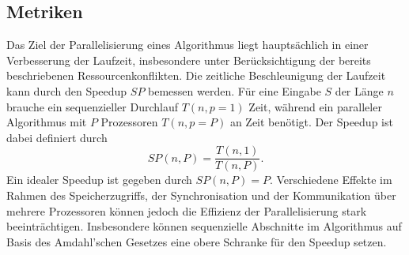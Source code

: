 \subsection{Metriken}
Das Ziel der Parallelisierung eines Algorithmus liegt hauptsächlich in einer Verbesserung der Laufzeit, insbesondere unter Berücksichtigung der bereits beschriebenen Ressourcenkonflikten. 
Die zeitliche Beschleunigung der Laufzeit kann durch den Speedup $SP$ bemessen werden. Für eine Eingabe $S$ der Länge $n$ brauche ein sequenzieller Durchlauf $T(n, p=1)$ Zeit, während ein 
paralleler Algorithmus mit $P$ Prozessoren $T(n,p=P)$ an Zeit benötigt. Der Speedup ist dabei definiert durch
\begin{equation}
    SP(n,P) = \frac{T(n,1)}{T(n,P)}.
\end{equation}
Ein idealer Speedup ist gegeben durch $SP(n,P)=P$. Verschiedene Effekte im Rahmen des Speicherzugriffs, der Synchronisation und der Kommunikation über mehrere Prozessoren können jedoch
die Effizienz der Parallelisierung stark beeinträchtigen. Insbesondere können sequenzielle Abschnitte im Algorithmus auf Basis des Amdahl'schen Gesetzes \cite{mccool} eine obere Schranke 
für den Speedup setzen. 